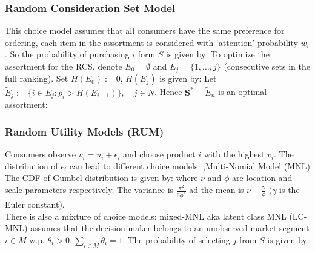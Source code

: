 \documentclass[12pt]{report}
\begin{document}
\subsubsection{Random Consideration Set Model}
This choice model assumes that all consumers have the same preference for ordering, each item in the assortment is  considered with `attention' probability $w_i$. 
So the probability of purchasing $i$ form $S$ is given by:
To optimize the assortment for the RCS, denote $E_0=\emptyset$ and $E_j=\{1,\ldots,j\}$ (consecutive sets in the full ranking). 
Set $H(E_0):=0$, $H(E_j)$ is given by:
Let $\tilde{E}_j:=\{i\in E_j:p_i>H(E_{i-1})\},\quad j\in N$. Hence $\mathbf{S}^{*}=\tilde{E}_{n}$ is an optimal assortment:
\subsubsection{Random Utility Models (RUM)}
Consumers observe $v_i=u_i+\epsilon_i$ and choose product $i$ with the highest $v_i$. The distribution of $\epsilon_i$ can lead to different choice models.
\sep{Multi-Nomial Model (MNL)}
The CDF of Gumbel distribution is given by:
where $\nu$ and $\phi$ are location and scale parameters respectively. The variance is $\frac{\pi^2}{6\phi^2}$ ad the mean is $\nu+\frac{\gamma}{\phi}$ ($\gamma$ is the
Euler constant).\\
There is also a mixture of choice models: mixed-MNL aka latent class MNL (LC-MNL) assumes that the decision-maker belongs to an unobserved market
segment $i\in M$ w.p. $\theta_i>0,\sum_{i\in M}\theta_i=1$. The probability of selecting $j$ from $S$ is given by:
\end{document}
